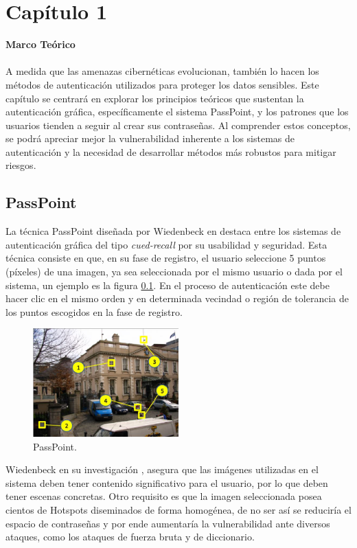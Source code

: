 \documentclass[12pt]{report}
\begin{document}
	
	
	
	

\setcounter{chapter}{1}

\chapter*{\LARGE{Capítulo 1}}
\vspace{-2em} %
\noindent\textbf{\LARGE Marco Teórico}\\
\vspace{2em}
\\
 A medida que las amenazas cibernéticas evolucionan, también lo hacen los métodos de autenticación utilizados para proteger los datos sensibles. Este capítulo se centrará en explorar los principios teóricos que sustentan la autenticación gráfica, específicamente el sistema PassPoint, y los patrones que los usuarios tienden a seguir al crear sus contraseñas. Al comprender estos conceptos, se podrá apreciar mejor la vulnerabilidad inherente a los sistemas de autenticación y la necesidad de desarrollar métodos más robustos para mitigar riesgos.

\section{PassPoint}
	La técnica PassPoint diseñada por Wiedenbeck en \cite{1} destaca entre los sistemas de autenticación gráfica del tipo \textit{cued-recall} por su usabilidad y seguridad.
	Esta técnica consiste en que, en su fase de registro, el
	usuario seleccione 5 puntos (píxeles) de una imagen, ya sea seleccionada por el mismo usuario o dada por el sistema, un ejemplo es la figura \ref{fig:PassPoint}. En el proceso de autenticación este debe hacer clic en el mismo orden y en determinada  vecindad o región de tolerancia de los puntos escogidos en la fase de registro.
	
			\begin{figure}[ht]
		\centering
		\includegraphics[width=0.5\textwidth]{passpoint.png}
		\caption{PassPoint.}
		\label{fig:PassPoint}
	\end{figure}
	Wiedenbeck en su investigación \cite{1}, asegura que las imágenes utilizadas en el sistema deben tener contenido significativo para el usuario, por lo que deben tener escenas concretas. Otro requisito es que la imagen seleccionada posea cientos de Hotspots diseminados de forma homogénea, de no ser así se reduciría el espacio de contraseñas y por ende aumentaría la vulnerabilidad ante diversos ataques, como los ataques de fuerza bruta y de diccionario.
	 
\end{document}
